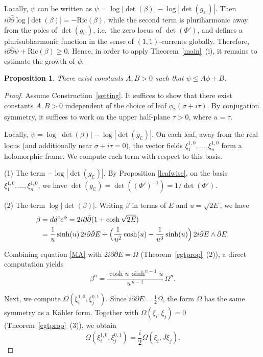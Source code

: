\documentclass[a4paper, 12pt]{article}
\newcommand{\Ric}{\mathrm{Ric}}
\newcommand{\idd}{i\partial\bar\partial}
\newcommand{\gC}{g_{\mathbb{C}}}
\newtheorem{prop}[thm]{Proposition}
\begin{document}
Locally, $\psi$ can be written as $\psi = \log |\det(\beta)| - \log |\det(\gC)|$. Then $\idd \log |\det(\beta)| = -\Ric(\beta)$, while the second term is pluriharmonic away from the poles of $\det(\gC)$, i.e.\ the zero locus of $\det(\Phi')$, and defines a plurisubharmonic function in the sense of $(1,1)$-currents globally. Therefore, $\idd \psi + \Ric(\beta) \ge 0$. Hence, in order to apply Theorem~\ref{main}~(i), it remains to estimate the growth of $\psi$.

\begin{prop}
There exist constants $A,B>0$ such that $\psi \le A \phi + B$.
\end{prop}

\begin{proof}
Assume Construction~\ref{setting}. It suffices to show that there exist constants $A,B>0$ independent of the choice of leaf $\phi_\gamma(\sigma+i\tau)$. By conjugation symmetry, it suffices to work on the upper half-plane $\tau>0$, where $u=\tau$.

Locally, $\psi = \log |\det(\beta)| - \log |\det(\gC)|$. On each leaf, away from the real locus (and additionally near $\sigma+i\tau=0$), the vector fields $\xi_1^{1,0},\dots,\xi_n^{1,0}$ form a holomorphic frame. We compute each term with respect to this basis.

\medskip
\noindent
(1) The term $-\log |\det(\gC)|$.
By Proposition \ref{leafwise}, on the basis $\xi_1^{1,0},\dots,\xi_n^{1,0}$, we have $\det(\gC)=\det((\Phi')^{-1})=1/\det(\Phi')$.

\medskip
\noindent
(2) The term $\log |\det(\beta)|$.
Writing $\beta$ in terms of $E$ and $u=\sqrt{2E}$, we have
\begin{align*}
\beta 
&= dd^c e^\phi = 2\idd(1+\cosh\sqrt{2E}) \\
&= \frac{1}{u}\sinh(u)\,2\idd E 
+ \Bigl(\frac{1}{u^2}\cosh(u) - \frac{1}{u^3}\sinh(u)\Bigr)\, 2i\partial E \wedge \bar\partial E.
\end{align*}

Combining equation \ref{MA} with $2\idd E = \Omega$ (Theorem~\ref{egtprop}~(2)), a direct computation yields
\[
\beta^n = \frac{\cosh u \, \sinh^{n-1} u}{u^{\,n-1}} \, \Omega^n.
\]

Next, we compute $\Omega(\xi_i^{1,0},\xi_j^{0,1})$. Since $\idd E = \tfrac{1}{2}\Omega$, the form $\Omega$ has the same symmetry as a Kähler form. Together with $\Omega(\xi_i,\xi_j)=0$ (Theorem~\ref{egtprop}~(3)), we obtain
\[
\Omega(\xi_i^{1,0},\xi_j^{0,1}) = \frac{i}{2}\Omega(\xi_i, J\xi_j).
\]


\end{proof}
\end{document}
